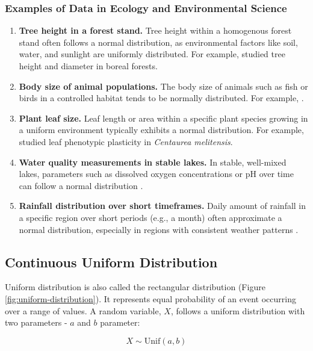 \documentclass[
]{book}
\begin{document}
\subsubsection{Examples of Data in Ecology and Environmental Science}\label{examples-of-data-in-ecology-and-environmental-science}

\begin{enumerate}
\def\labelenumi{\arabic{enumi}.}
\item
  \textbf{Tree height in a forest stand.} Tree height within a homogenous forest stand often follows a normal distribution, as environmental factors like soil, water, and sunlight are uniformly distributed. For example, \citet{zhang2015} studied tree height and diameter in boreal forests.
\item
  \textbf{Body size of animal populations.} The body size of animals such as fish or birds in a controlled habitat tends to be normally distributed. For example, \citet{bonner2011}.
\item
  \textbf{Plant leaf size.} Leaf length or area within a specific plant species growing in a uniform environment typically exhibits a normal distribution. For example, \citet{nicotra2010} studied leaf phenotypic plasticity in \emph{Centaurea melitensis}.
\item
  \textbf{Water quality measurements in stable lakes.} In stable, well-mixed lakes, parameters such as dissolved oxygen concentrations or pH over time can follow a normal distribution \citep{wetzel2001}.
\item
  \textbf{Rainfall distribution over short timeframes.} Daily amount of rainfall in a specific region over short periods (e.g., a month) often approximate a normal distribution, especially in regions with consistent weather patterns \citep{wilks2006}.
\end{enumerate}

\subsection{Continuous Uniform Distribution}\label{continuous-uniform-distribution}

Uniform distribution is also called the rectangular distribution (Figure \ref{fig:uniform-distribution}). It represents equal probability of an event occurring over a range of values. A random variable, \(X\), follows a uniform distribution with two parameters - \(a\) and \(b\) parameter:

\[X \sim \text{Unif}(a, b)\]
\end{document}
